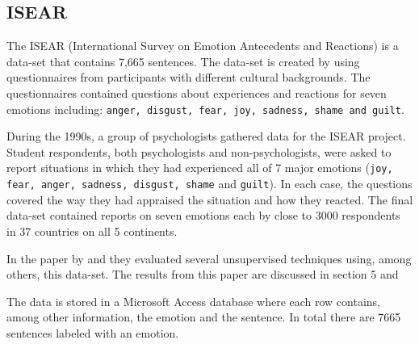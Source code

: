 \documentclass[11pt]{article}
\begin{document}
\subsection{ISEAR}
The ISEAR (International Survey on Emotion Antecedents and Reactions) is a data-set that contains 7,665 sentences. The data-set is created by using questionnaires from participants with different cultural backgrounds. The questionnaires contained questions about experiences and reactions for seven emotions including: \texttt{anger, disgust, fear, joy, sadness, shame and guilt}. 


During the 1990s, a group of psychologists gathered data for the ISEAR project. Student respondents, both psychologists and non-psychologists, were asked to report situations in which they had experienced all of 7 major emotions (\texttt{joy, fear, anger, sadness, disgust, shame} and \texttt {guilt}). In each case, the questions covered the way they had appraised the situation and how they reacted. The final data-set contained reports on seven emotions each by close to 3000 respondents in 37 countries on all 5 continents.

In the paper by  and  they evaluated several unsupervised techniques using, among others, this data-set. The results from this paper are discussed in section 5 \cite{kim2010evaluation} and \cite{calvo2013emotions }

The data is stored in a Microsoft Access database where each row contains, among other information, the emotion and the sentence. In total there are 7665 sentences labeled with an emotion.
\end{document}
